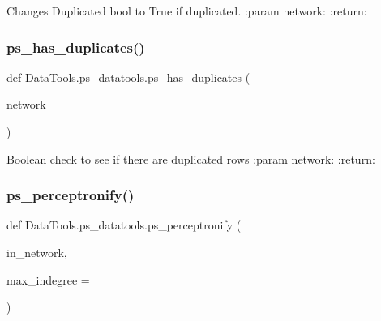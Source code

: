 \begin{DoxyVerb}Changes Duplicated bool to True if duplicated.
:param network:
:return:
\end{DoxyVerb}
 \mbox{\label{namespace_data_tools_1_1ps__datatools_a576d7bf488a40d757591fb7d2bf8a450}} 
\subsubsection{\texorpdfstring{ps\+\_\+has\+\_\+duplicates()}{ps\_has\_duplicates()}}
{\footnotesize\ttfamily def Data\+Tools.\+ps\+\_\+datatools.\+ps\+\_\+has\+\_\+duplicates (\begin{DoxyParamCaption}\item[{}]{network }\end{DoxyParamCaption})}

\begin{DoxyVerb}Boolean check to see if there are duplicated rows
:param network:
:return:
\end{DoxyVerb}
 \mbox{\label{namespace_data_tools_1_1ps__datatools_a9df7c7cd4b349ceeefe4e9cdcc11b181}} 
\subsubsection{\texorpdfstring{ps\+\_\+perceptronify()}{ps\_perceptronify()}}
{\footnotesize\ttfamily def Data\+Tools.\+ps\+\_\+datatools.\+ps\+\_\+perceptronify (\begin{DoxyParamCaption}\item[{}]{in\+\_\+network,  }\item[{}]{max\+\_\+indegree = {} }\end{DoxyParamCaption})}

